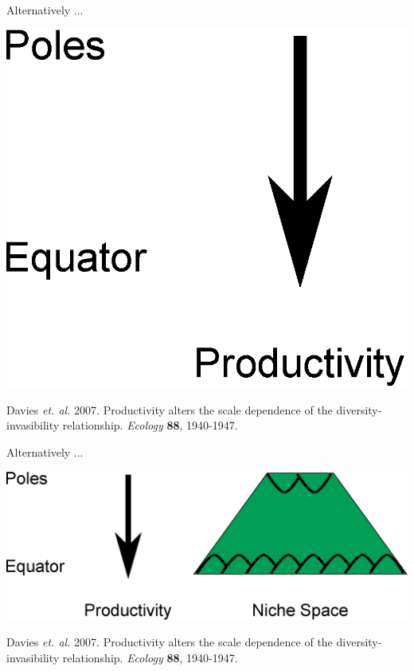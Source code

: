 \documentclass{beamer}
\begin{document}
  \begin{frame}{Alternatively ...}

    \begin{center}
      \includegraphics[width=.8\textwidth]{Figures/latitude_niche_breadth_4.eps}
    \end{center}

    \footnotesize{Davies \emph{et. al.} 2007. Productivity alters the scale dependence of the diversity-invasibility relationship. \emph{Ecology} \textbf{88}, 1940-1947.}
  \end{frame}


  \begin{frame}{Alternatively ...}

    \begin{center}
      \includegraphics[width=.8\textwidth]{Figures/latitude_niche_breadth_5.eps}
    \end{center}

    \footnotesize{Davies \emph{et. al.} 2007. Productivity alters the scale dependence of the diversity-invasibility relationship. \emph{Ecology} \textbf{88}, 1940-1947.}
  \end{frame}
\end{document}
